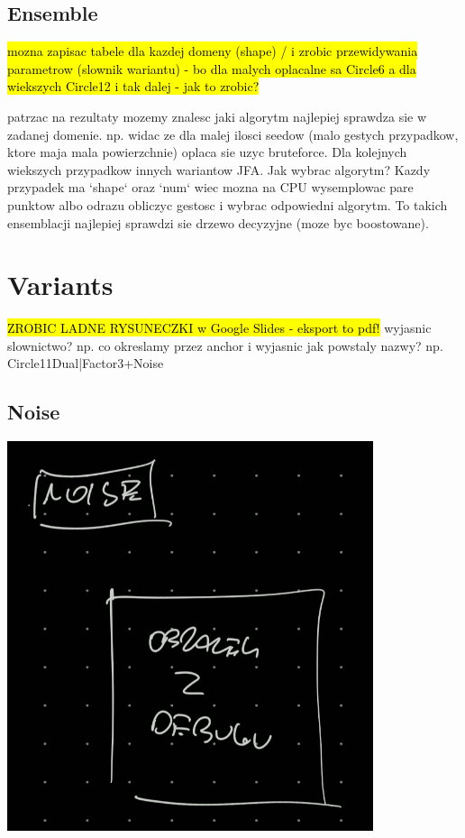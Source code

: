 \documentclass{article}
\begin{document}
\subsection{Ensemble} %

\hl{mozna zapisac tabele dla kazdej domeny (shape) / i zrobic przewidywania
parametrow (slownik wariantu) - bo dla malych oplacalne sa Circle6 a dla
wiekszych Circle12 i tak dalej - jak to zrobic?}

patrzac na rezultaty mozemy znalesc jaki algorytm najlepiej sprawdza sie w
zadanej domenie. np. widac ze dla malej ilosci seedow (malo gestych przypadkow,
ktore maja mala powierzchnie) oplaca sie uzyc bruteforce. Dla kolejnych
wiekszych przypadkow innych wariantow JFA. Jak wybrac algorytm? Kazdy przypadek ma `shape` oraz `num` wiec mozna na CPU wysemplowac
pare punktow albo odrazu obliczyc gestosc i wybrac odpowiedni algorytm.
To takich ensemblacji najlepiej sprawdzi sie drzewo decyzyjne (moze byc boostowane).

\section{Variants} %

\hl{ZROBIC LADNE RYSUNECZKI w Google Slides - eksport to pdf!}
wyjasnic slownictwo? np. co okreslamy przez anchor
i wyjasnic jak powstaly nazwy? np. Circle11Dual|Factor3+Noise

\subsection{Noise} %

\includegraphics[width=0.5\linewidth]{../figures/idea_noise}
\end{document}
